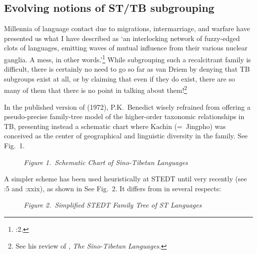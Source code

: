 \subsection{Evolving notions of ST/TB subgrouping}

Millennia of language contact due to migrations, intermarriage, and warfare have presented us what I
have described as ‘an interlocking network of fuzzy-edged clots of languages,
emitting waves of mutual influence from their various nuclear ganglia. A mess,
in other words.’\footnote{\textit{}:2.}  While subgrouping such
a recalcitrant family is difficult, there is certainly no need to go so far as
van Driem by denying that TB subgroups exist at all, or by claiming that even if
they do exist, there are so many of them that there is no point in talking about
them!\footnote{See his review \citeyearpar{SVD-STL} of \citealt{STL},
\textit{The Sino-Tibetan Languages}.}


In the published version of \textit{} (1972),
P.K.\ Benedict wisely refrained from offering a pseudo-precise family-tree model of
the higher-order taxonomic relationships in TB, presenting instead a schematic
chart where Kachin (=~Jingpho) was conceived as the center of geographical and
linguistic diversity in the family. See Fig.~1.

\begin{figure}[ht]
\begin{center}
\textit{Figure 1.~Schematic Chart of Sino-Tibetan Languages}\footnotemark
\end{center}
\end{figure}

A simpler scheme has been used heuristically at STEDT until very recently (see \textit{}:5 and \textit{}:xxix), as shown in  See Fig.~2. It differs from \textit{} in several respects:

\begin{figure}[ht]
\begin{center}
\textit{Figure 2.~Simplified STEDT Family Tree of ST Languages}
\end{center}
\end{figure}

